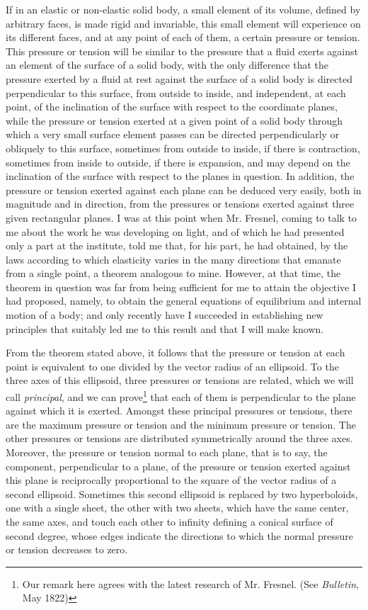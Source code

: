 \documentclass[openright,smallroyalvopaper,8pt,twoside,showtrims]{memoir}
\begin{document}
If in an elastic or non-elastic solid body, a small element of its volume, defined by arbitrary faces, is made rigid and invariable, this small element will experience on its different faces, and at any point of each of them, a certain pressure or tension. This pressure or tension will be similar to the pressure that a fluid exerts against an element of the surface of a solid body, with the only difference that the pressure exerted by a fluid at rest against the surface of a solid body is directed perpendicular to this surface, from outside to inside, and independent, at each point, of the inclination of the surface with respect to the coordinate planes, while the pressure or tension exerted at a given point of a solid body through which a very small surface element passes can be directed perpendicularly or obliquely to this surface, sometimes from outside to inside, if there is contraction, sometimes from inside to outside, if there is expansion, and may depend on the inclination of the surface with respect to the planes in question. In addition, the pressure or tension exerted against each plane can be deduced very easily, both in magnitude and in direction, from the pressures or tensions exerted against three given rectangular planes. I was at this point when Mr. Fresnel, coming to talk to me about the work he was developing on light, and of which he had presented only a part at the institute, told me that, for his part, he had obtained, by the laws according to which elasticity varies in the many directions that emanate from a single point, a theorem analogous to mine. However, at that time, the theorem in question was far from being sufficient for me to attain the objective I had proposed, namely, to obtain the general equations of equilibrium and internal motion of a body; and only recently have I  succeeded in establishing new principles that suitably led me to this result and that I will make known. 


From the theorem stated above, it follows that the pressure or tension at each point is equivalent to one divided by the vector radius of an ellipsoid. To the three axes of this ellipsoid, three pressures or tensions are related, which we will call \emph{principal}, and we can prove\footnote{Our remark here agrees with the latest research of Mr. Fresnel. (See \emph{Bulletin}, May 1822)} that each of them is perpendicular to the plane against which it is exerted. Amongst these principal pressures or tensions, there are the maximum pressure or tension and the minimum pressure or tension. The other pressures or tensions are distributed symmetrically around the three axes. Moreover, the pressure or tension normal to each plane, that is to say, the component, perpendicular to a plane, of the pressure or tension exerted against this plane is reciprocally proportional to the square of the vector radius of a second ellipsoid. Sometimes this second ellipsoid is replaced by two hyperboloids, one with a single sheet, the other with two sheets, which have the same center, the same axes, and touch each other to infinity defining a conical surface of second degree, whose edges indicate the directions to which the normal pressure or tension decreases to zero. 
\end{document}
